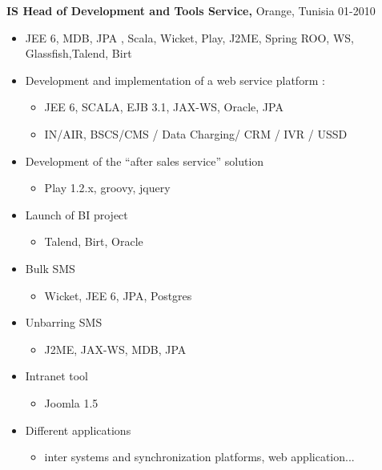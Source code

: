\documentclass{res}
\begin{document}
\begin{resume}
{\bf IS Head of Development and Tools Service,} Orange, Tunisia \hfill   01-2010
\begin{itemize} \itemsep -2pt  %

\item JEE 6, MDB, JPA , Scala, Wicket, Play, J2ME, Spring ROO, WS, Glassfish,Talend, Birt

\item Development and implementation of a web service platform :
\begin{itemize} \itemsep -2pt  %
\item JEE 6, SCALA, EJB 3.1, JAX-WS, Oracle, JPA
\item IN/AIR, BSCS/CMS / Data Charging/ CRM / IVR /  USSD
\end{itemize}
\item Development of the “after sales service” solution
\begin{itemize} \itemsep -2pt  %
\item Play 1.2.x, groovy, jquery
\end{itemize}
\item Launch of BI project
\begin{itemize} \itemsep -2pt  %
\item Talend, Birt, Oracle
\end{itemize}
\item Bulk SMS
\begin{itemize} \itemsep -2pt  %
\item Wicket, JEE 6, JPA, Postgres
\end{itemize}
\item Unbarring SMS
\begin{itemize} \itemsep -2pt  %
\item J2ME, JAX-WS, MDB, JPA
\end{itemize}
\item Intranet tool
\begin{itemize} \itemsep -2pt  %
\item Joomla 1.5
\end{itemize}
\item Different applications
\begin{itemize} \itemsep -2pt  %
\item inter systems and synchronization platforms, web application...
\end{itemize}
\end{itemize}


\end{resume}
\end{document}
